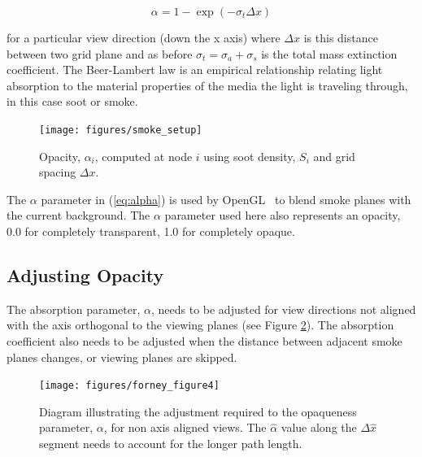 \begin{equation}
\label{eq:alpha}
\alpha=1-\exp(-\sigma_t\Delta x)
\end{equation}

\noindent for a particular view direction (down the x axis) where $\Delta x$ is this distance between two grid plane and as before $\sigma_t=\sigma_a+\sigma_s$ is the total mass extinction coefficient.  The Beer-Lambert law is an empirical relationship relating light absorption to the material properties of the media the light is traveling through, in this case soot or smoke.

\begin{figure}[\figoptions]
\begin{center}
\texttt{[image: figures/smoke\_setup]}
\end{center}
\caption {Opacity, $\alpha_i$, computed at node $i$ using soot density, $S_i$ and grid spacing $\Delta x$.}
\label{figsmokesetup}
\end{figure}

The $\alpha$ parameter in (\ref{eq:alpha}) is used by OpenGL~\cite{OpenGLRed} to blend smoke planes with the current background.  The $\alpha$ parameter used here also represents an opacity, 0.0 for completely transparent, 1.0 for completely opaque.


\subsection{Adjusting Opacity}

The absorption parameter, $\alpha$, needs to be adjusted for view directions not aligned with the axis orthogonal to the viewing planes (see Figure \ref{figray}).  The absorption coefficient also needs to be adjusted when the distance between adjacent smoke planes changes, or viewing planes are skipped.

\begin{figure}[\figoptions]
\centerline{\texttt{[image: figures/forney\_figure4]}}
\caption [Diagram illustrating the adjustment required to the opaqueness parameter, $\alpha$,
for non-axis aligned views.] { Diagram
illustrating the adjustment required to the opaqueness parameter, $\alpha$,
for non axis aligned views. The $\hat{\alpha}$ value along the $\Delta\hat{x}$ segment needs to account for
the longer path length. } \label{figray}
\end{figure}

